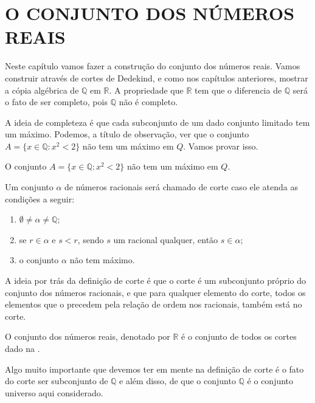 \documentclass[../main.tex]{subfiles}
\begin{document}
\chapter{O CONJUNTO DOS NÚMEROS REAIS}\label{cap-reais}

Neste capítulo vamos fazer a construção do conjunto dos números reais. Vamos construir através de cortes de Dedekind, e como nos capítulos anteriores, mostrar a cópia algébrica de $\mathbb{Q}$ em $\mathbb{R}$. A propriedade que $\mathbb{R}$ tem que o diferencia de $\mathbb{Q}$ será o fato de ser completo, pois $\mathbb{Q}$ não é completo.

A ideia de completeza é que cada subconjunto de um dado conjunto limitado tem um máximo. Podemos, a título de observação, ver que o conjunto 
$A = \{ x \in \mathbb{Q} : x^2 < 2\}$ não tem um máximo em $Q$. Vamos provar isso.
\begin{prop}
    O conjunto $A = \{ x \in \mathbb{Q} : x^2 < 2\}$ não tem um máximo em $Q$.
\end{prop}
\begin{dem}
\end{dem}

\begin{defi}\label{reais-def-corte}
    Um conjunto $\alpha$ de números racionais será chamado de corte caso ele atenda as condições a seguir:
    \begin{enumerate}[label=(\roman*)]
        \item\label{reais-corte-subconjProprio} $\emptyset \neq \alpha \neq \mathbb{Q}$;
        \item\label{reais-corte-precede} se $r \in \alpha$ e $s < r$, sendo $s$ um racional qualquer, então $s \in \alpha$;
        \item\label{reais-corte-semMaximo} o conjunto $\alpha$ não tem máximo.
    \end{enumerate}
\end{defi}

A ideia por trás da definição de corte é que o corte é um subconjunto próprio do conjunto dos números racionais, e que para qualquer elemento do corte, todos os elementos que o precedem pela relação de ordem nos racionais, também está no corte.

\begin{defi}
    O conjunto dos números reais, denotado por $\mathbb{R}$ é o conjunto de todos os cortes dado na .
\end{defi}

\begin{obs}
    Algo muito importante que devemos ter em mente na definição de corte é o fato do corte ser subconjunto de $\mathbb{Q}$ e além disso, de que o conjunto $\mathbb{Q}$ é o conjunto universo aqui considerado.
\end{obs}
\end{document}
